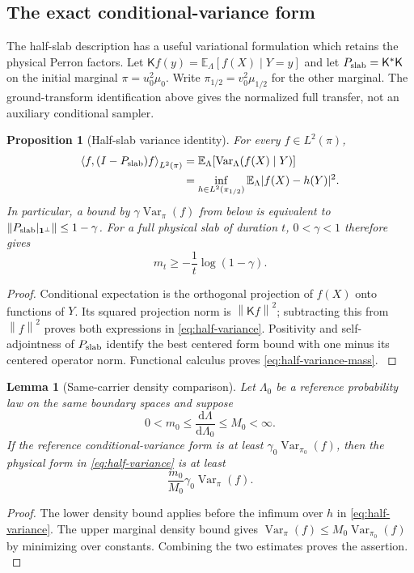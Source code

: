 \documentclass[11pt,oneside,openany]{book}
\newtheorem{proposition}[proposition]{Proposition}
\newtheorem{lemma}[lemma]{Lemma}
\theoremstyle{definition}
\theoremstyle{remark}
\newcommand{\E}{\mathbb E}
\newcommand{\one}{\mathbf1}
\newcommand{\dd}{\mathrm d}
\newcommand{\Var}{\operatorname{Var}}
\newcommand{\norm}[1]{\left\lVert#1\right\rVert}
\newcommand{\ip}[2]{\left\langle#1,#2\right\rangle}
\newcommand{\src}[2]{\cite[#2]{#1}}
\begin{document}
\subsection{The exact conditional-variance form}
The half-slab description has a useful variational formulation which
retains the physical Perron factors. Let $\mathsf Kf(y)=\E_\Lambda[f(X)\mid
Y=y]$ and let $P_{\rm slab}=\mathsf K^*\mathsf K$ on the initial marginal
$\pi=u_0^2\mu_0$. Write $\pi_{1/2}=v_0^2\mu_{1/2}$ for the
other marginal. The ground-transform identification above gives the normalized
full transfer, not an auxiliary conditional sampler.

\begin{proposition}[Half-slab variance identity]
\label{prop:half-variance}
For every $f\in L^2(\pi)$,
\begin{equation}\label{eq:half-variance}
\begin{aligned}
\ip{f}{(I-P_{\rm slab})f}_{L^2(\pi)}
&=\E_\Lambda\!\left[\Var_\Lambda(f(X)\mid Y)\right]\\
&=\inf_{h\in L^2(\pi_{1/2})}
  \E_\Lambda|f(X)-h(Y)|^2.
\end{aligned}
\end{equation}
In particular, a bound by $\gamma\Var_\pi(f)$ from below is equivalent
to $\norm{P_{\rm slab}|_{\one^\perp}}\le1-\gamma$. For a full physical
slab of duration $t$, $0<\gamma<1$ therefore gives
\begin{equation}\label{eq:half-variance-mass}
 m_t\ge-\frac1t\log(1-\gamma).
\end{equation}
\end{proposition}
\begin{proof}
Conditional expectation is the orthogonal projection of $f(X)$ onto
functions of $Y$. Its squared projection norm is $\norm{\mathsf Kf}^2$;
subtracting this from $\norm f^2$ proves both expressions in
\cref{eq:half-variance}. Positivity and self-adjointness of
$P_{\rm slab}$ identify the best centered form bound with one minus
its centered operator norm. Functional calculus proves
\cref{eq:half-variance-mass}. \src{F6}{V58}
\end{proof}

\begin{lemma}[Same-carrier density comparison]
\label{lem:half-density-comparison}
Let $\Lambda_0$ be a reference probability law on the same boundary
spaces and suppose
\[
0<m_0\le\frac{\dd\Lambda}{\dd\Lambda_0}\le M_0<\infty.
\]
If the reference conditional-variance form is at least
$\gamma_0\Var_{\pi_0}(f)$, then the physical form in
\cref{eq:half-variance} is at least
\begin{equation}\label{eq:half-density-comparison}
\frac{m_0}{M_0}\gamma_0\Var_\pi(f).
\end{equation}
\end{lemma}
\begin{proof}
The lower density bound applies before the infimum over $h$ in
\cref{eq:half-variance}. The upper marginal density bound gives
$\Var_\pi(f)\le M_0\Var_{\pi_0}(f)$ by minimizing over constants.
Combining the two estimates proves the assertion. \src{F6}{V58}
\end{proof}
\end{document}
